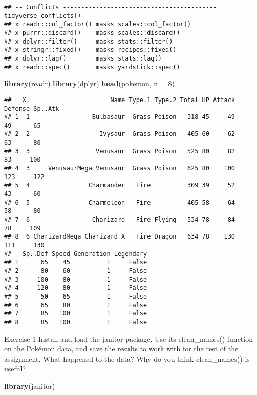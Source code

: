 \documentclass[]{article}
\newenvironment{Shaded}{\begin{snugshade}}{\end{snugshade}}
\newcommand{\DataTypeTok}[1]{\textcolor[rgb]{0.13,0.29,0.53}{#1}}
\newcommand{\DecValTok}[1]{\textcolor[rgb]{0.00,0.00,0.81}{#1}}
\newcommand{\KeywordTok}[1]{\textcolor[rgb]{0.13,0.29,0.53}{\textbf{#1}}}
\newcommand{\NormalTok}[1]{#1}
\begin{document}
\begin{verbatim}
## -- Conflicts ------------------------------------------ tidyverse_conflicts() --
## x readr::col_factor() masks scales::col_factor()
## x purrr::discard()    masks scales::discard()
## x dplyr::filter()     masks stats::filter()
## x stringr::fixed()    masks recipes::fixed()
## x dplyr::lag()        masks stats::lag()
## x readr::spec()       masks yardstick::spec()
\end{verbatim}

\begin{Shaded}
\begin{Highlighting}[]
\KeywordTok{library}\NormalTok{(readr)}
\KeywordTok{library}\NormalTok{(dplyr)}
\KeywordTok{head}\NormalTok{(pokemon, }\DataTypeTok{n =} \DecValTok{8}\NormalTok{)}
\end{Highlighting}
\end{Shaded}

\begin{verbatim}
##   X.                      Name Type.1 Type.2 Total HP Attack Defense Sp..Atk
## 1  1                 Bulbasaur  Grass Poison   318 45     49      49      65
## 2  2                   Ivysaur  Grass Poison   405 60     62      63      80
## 3  3                  Venusaur  Grass Poison   525 80     82      83     100
## 4  3     VenusaurMega Venusaur  Grass Poison   625 80    100     123     122
## 5  4                Charmander   Fire          309 39     52      43      60
## 6  5                Charmeleon   Fire          405 58     64      58      80
## 7  6                 Charizard   Fire Flying   534 78     84      78     109
## 8  6 CharizardMega Charizard X   Fire Dragon   634 78    130     111     130
##   Sp..Def Speed Generation Legendary
## 1      65    45          1     False
## 2      80    60          1     False
## 3     100    80          1     False
## 4     120    80          1     False
## 5      50    65          1     False
## 6      65    80          1     False
## 7      85   100          1     False
## 8      85   100          1     False
\end{verbatim}

Exercise 1 Install and load the janitor package. Use its clean\_names()
function on the Pokémon data, and save the results to work with for the
rest of the assignment. What happened to the data? Why do you think
clean\_names() is useful?

\begin{Shaded}
\begin{Highlighting}[]
\KeywordTok{library}\NormalTok{(janitor)}
\end{Highlighting}
\end{Shaded}
\end{document}
